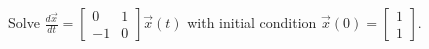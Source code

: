 \documentclass[../main.tex]{subfiles}
\begin{document}
\begin{example}
  Solve \(\frac{d\vec{x}}{dt} = \begin{bmatrix} 0 & 1 \\ -1 & 0 \end{bmatrix}\vec{x}(t)\) with initial condition \(\vec{x}(0) = \begin{bmatrix} 1 \\ 1 \end{bmatrix}\).
\end{example}
\end{document}

